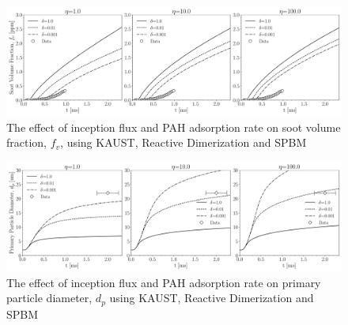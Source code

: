 \begin{figure}[H]
	\centering
	\includegraphics[width=1\textwidth]{Figures/Results/Shocktube/Stanford/TEM/10CH4_TEM_vf_incepPAHsens.pdf}
	\caption{The effect of inception flux and PAH adsorption rate on soot volume fraction, $f_v$, using KAUST, Reactive Dimerization and SPBM}
	\label{fig:shocktube_vf_incepPAHRD} 
\end{figure}


\begin{figure}[H]
	\centering
	\includegraphics[width=1\textwidth]{Figures/Results/Shocktube/Stanford/TEM/10CH4_TEM_dp_incepPAHsens.pdf}
	\caption{The effect of inception flux and PAH adsorption rate on primary particle diameter, $d_p$ using KAUST, Reactive Dimerization and SPBM}
	\label{fig:shocktube_dp_incepPAHRD} 
\end{figure}

